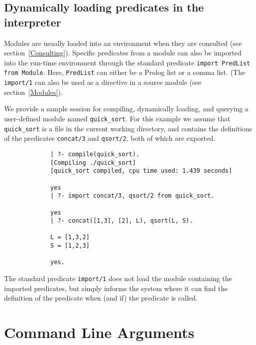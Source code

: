 \subsection{Dynamically loading predicates in the interpreter}
Modules are usually loaded into an environment when they are consulted
(see section~\ref{Consulting}).  Specific predicates from a module can
also be imported into the run-time environment through the standard 
predicate {\tt import PredList from Module}.
Here, {\tt PredList} can either be a Prolog list or a comma list.  (The
{\tt import/1} can also be used as a directive in a source module 
(see section~\ref{Modules}).

We provide a sample session for compiling, dynamically loading, and 
querying a user-defined module named {\tt quick\_sort}.
For this example we assume that {\tt quick\_sort} is a file in the 
current working directory, and contains the definitions of the
predicates {\tt concat/3} and {\tt qsort/2}, both of which are exported.

{\footnotesize
\begin{verbatim}
             | ?- compile(quick_sort).
             [Compiling ./quick_sort]
             [quick_sort compiled, cpu time used: 1.439 seconds]

             yes
             | ?- import concat/3, qsort/2 from quick_sort. 

             yes
             | ?- concat([1,3], [2], L), qsort(L, S).

             L = [1,3,2]
             S = [1,2,3]

             yes.
\end{verbatim}
}

The standard predicate {\tt import/1} does not load the module 
containing the imported predicates, but simply informs the system 
where it can find the definition of the predicate when (and if) the
predicate is called.


\section{Command Line Arguments} \label{emulator_options}

